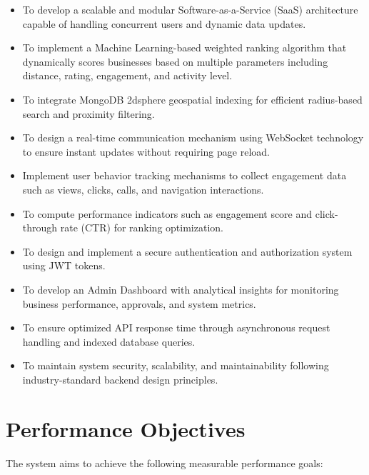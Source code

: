 \documentclass[12pt,a4paper]{report}
\begin{document}
\begin{itemize}

\item To develop a scalable and modular Software-as-a-Service (SaaS) architecture capable of handling concurrent users and dynamic data updates.

\item To implement a Machine Learning-based weighted ranking algorithm that dynamically scores businesses based on multiple parameters including distance, rating, engagement, and activity level.

\item To integrate MongoDB 2dsphere geospatial indexing for efficient radius-based search and proximity filtering.

\item To design a real-time communication mechanism using WebSocket technology to ensure instant updates without requiring page reload.

\item Implement user behavior tracking mechanisms to collect engagement data such as views, clicks, calls, and navigation interactions.

\item To compute performance indicators such as engagement score and click-through rate (CTR) for ranking optimization.

\item To design and implement a secure authentication and authorization system using JWT tokens.

\item To develop an Admin Dashboard with analytical insights for monitoring business performance, approvals, and system metrics.

\item To ensure optimized API response time through asynchronous request handling and indexed database queries.

\item To maintain system security, scalability, and maintainability following industry-standard backend design principles.

\end{itemize}

\section{Performance Objectives}

The system aims to achieve the following measurable performance goals:
\end{document}
